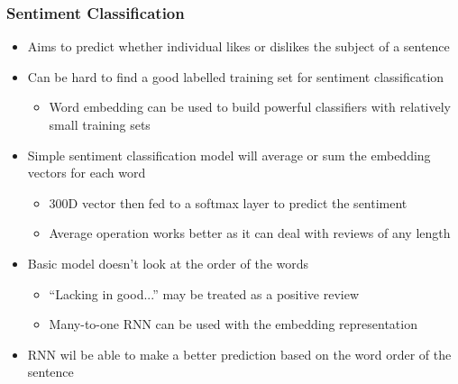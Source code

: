 \documentclass[12pt, letterpaper]{article}
\begin{document}
    \subsubsection{Sentiment Classification}
    \begin{itemize}
        \item Aims to predict whether individual likes or dislikes the subject of a sentence
        \item Can be hard to find a good labelled training set for sentiment classification
        \begin{itemize}
            \item Word embedding can be used to build powerful classifiers with relatively small training sets
        \end{itemize}  
        \item Simple sentiment classification model will average or sum the embedding vectors for each word
        \begin{itemize}
            \item 300D vector then fed to a softmax layer to predict the sentiment
            \item Average operation works better as it can deal with reviews of any length 
        \end{itemize}
        \item Basic model doesn't look at the order of the words
        \begin{itemize}
            \item ``Lacking in good...'' may be treated as a positive review
            \item Many-to-one RNN can be used with the embedding representation 
        \end{itemize}
        \item RNN wil be able to make a better prediction based on the word order of the sentence
    \end{itemize}
\end{document}
